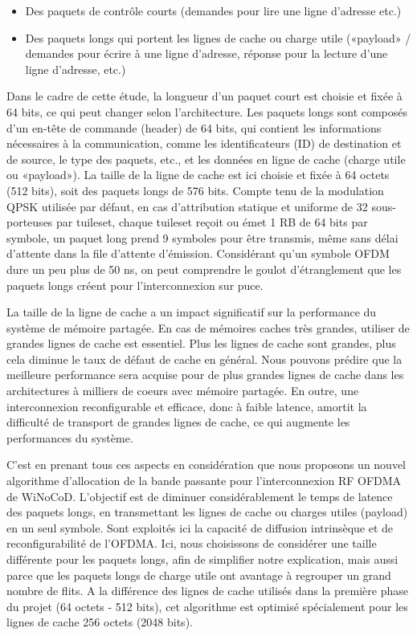 \begin{itemize}
  \item Des paquets de contrôle courts (demandes pour lire une ligne d'adresse etc.)
  \item Des paquets longs qui portent les lignes de cache ou charge utile («payload» / demandes pour écrire à une ligne d'adresse, réponse pour la lecture d'une ligne d'adresse, etc.)
\end{itemize}

Dans le cadre de cette étude, la longueur d'un paquet court est choisie et fixée à 64 bits, ce qui peut changer selon l'architecture. Les paquets longs sont composés d'un en-tête de commande (header) de 64 bits, qui contient les informations nécessaires à la communication, comme les identificateurs (ID) de destination et de source, le type des paquets, etc., et les données en ligne de cache (charge utile ou «payload»). La taille de la ligne de cache est ici choisie et fixée à 64 octets (512 bits), soit des paquets longs de 576 bits. Compte tenu de la modulation QPSK utilisée par défaut, en cas d'attribution statique et uniforme de 32 sous-porteuses par tuileset, chaque tuileset reçoit ou émet 1 RB de 64 bits par symbole, un paquet long prend 9 symboles pour être transmis, même sans délai d'attente dans la file d'attente d’émission. Considérant qu’un symbole OFDM dure un peu plus de 50 ns, on peut comprendre le goulot d'étranglement que les paquets longs créent pour l'interconnexion sur puce. 

La taille de la ligne de cache a un impact significatif sur la performance du système de mémoire partagée. En cas de mémoires caches très grandes, utiliser de grandes lignes de cache est essentiel. Plus les lignes de cache sont grandes, plus cela diminue le taux de défaut de cache en général. Nous pouvons prédire que la meilleure performance sera acquise pour de plus grandes lignes de cache dans les architectures à milliers de coeurs avec mémoire partagée. En outre, une interconnexion reconfigurable et efficace, donc à faible latence, amortit la difficulté de transport de grandes lignes de cache, ce qui augmente les performances du système.

C’est en prenant tous ces aspects en considération que nous proposons un nouvel algorithme d'allocation de la bande passante pour l'interconnexion RF OFDMA de WiNoCoD. L’objectif est de diminuer considérablement le temps de latence des paquets longs, en transmettant les lignes de cache ou charges utiles (payload) en un seul symbole. Sont exploités ici la capacité de diffusion intrinsèque et de reconfigurabilité de l’OFDMA. Ici, nous choisissons de considérer une taille différente pour les paquets longs, afin de simplifier notre explication, mais aussi parce que les paquets longs de charge utile ont avantage à regrouper un grand nombre de flits. A la différence  des lignes de cache utilisés dans la première phase du projet (64 octets - 512 bits), cet algorithme est optimisé spécialement pour les lignes de cache 256 octets (2048 bits).

